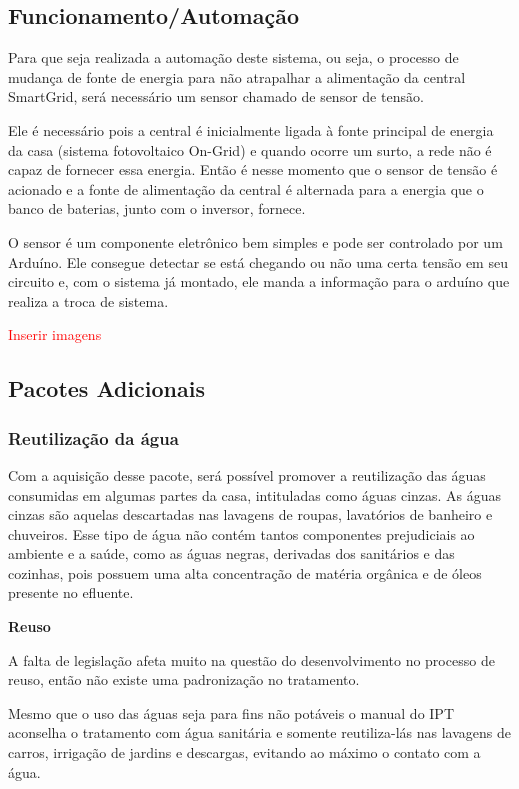 \subsection{Funcionamento/Automação}
\par Para que seja realizada a automação deste sistema, ou seja, o processo de mudança de fonte de energia para não atrapalhar a alimentação da central SmartGrid, será necessário um sensor chamado de sensor de tensão.
\par Ele é necessário pois a central é inicialmente ligada à fonte principal de energia da casa (sistema fotovoltaico On-Grid) e quando ocorre um surto, a rede não é capaz de fornecer essa energia. Então é nesse momento que o sensor de tensão é acionado e a fonte de alimentação da central é alternada para a energia que o banco de baterias, junto com o inversor, fornece.
\par O sensor é um componente eletrônico bem simples e pode ser controlado por um Arduíno. Ele consegue detectar se está chegando ou não uma certa tensão em seu circuito e, com o sistema já montado, ele manda a informação para o arduíno que realiza a troca de sistema.

\textcolor{red}{Inserir imagens}

\subsection{Pacotes Adicionais}

\subsubsection{Reutilização da água}
\par Com a aquisição desse pacote, será possível promover a reutilização das águas consumidas em algumas partes da casa, intituladas como águas cinzas. As águas cinzas são aquelas descartadas nas lavagens de roupas, lavatórios de banheiro e chuveiros. Esse tipo de água não contém tantos componentes prejudiciais ao ambiente e a saúde, como as águas negras, derivadas dos sanitários e das cozinhas, pois possuem uma alta concentração de matéria orgânica e de óleos presente no efluente.

\textbf{Reuso}
\par A falta de legislação afeta muito na questão do desenvolvimento no processo de reuso, então não existe uma padronização no tratamento.
\par Mesmo que o uso das águas seja para fins não potáveis o manual do IPT aconselha o tratamento com água sanitária e somente reutiliza-lás nas lavagens de carros, irrigação de jardins e descargas, evitando ao máximo o contato com a água.

